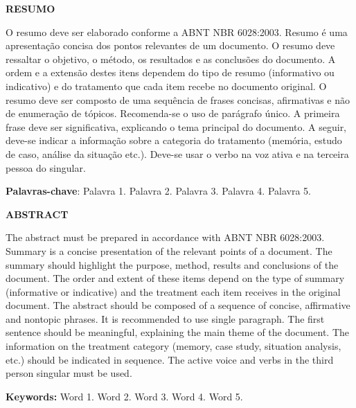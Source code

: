 \documentclass[12pt]{article}
\begin{document}
{\setlength{\parindent}{0cm} %


\begin{center}
	\textbf{RESUMO}
\end{center}



O resumo deve ser elaborado conforme a ABNT NBR 6028:2003. Resumo é uma apresentação concisa dos pontos relevantes de um documento. O resumo deve ressaltar o objetivo, o método, os resultados e as conclusões do documento. A ordem e a extensão destes itens dependem do tipo de resumo (informativo ou indicativo) e do tratamento que cada item recebe no documento original. O resumo deve ser composto de uma sequência de frases concisas, afirmativas e não de enumeração de tópicos. Recomenda-se o uso de parágrafo único. A primeira frase deve ser significativa, explicando o tema principal do documento. A seguir, deve-se indicar a informação sobre a categoria do tratamento (memória, estudo de caso, análise da situação etc.). Deve-se usar o verbo na voz ativa e na terceira pessoa do singular. 



\vspace{2ex}

\textbf{Palavras-chave}: Palavra 1. Palavra 2. Palavra 3. Palavra 4. Palavra 5.




\begin{center}
	\textbf{ABSTRACT}
\end{center}


The abstract must be prepared in accordance with ABNT NBR 6028:2003. Summary is a concise presentation of the relevant points of a document. The summary should highlight the purpose, method, results and conclusions of the document. The order and extent of these items depend on the type of summary (informative or indicative) and the treatment each item receives in the original document. The abstract should be composed of a sequence of concise, affirmative and nontopic phrases. It is recommended to use single paragraph. The first sentence should be meaningful, explaining the main theme of the document. The information on the treatment category (memory, case study, situation analysis, etc.) should be indicated in sequence. The active voice and verbs in the third person singular must be used.

\vspace{2ex}

\textbf{Keywords:} Word 1. Word 2. Word 3. Word 4. Word 5.

}
\end{document}
